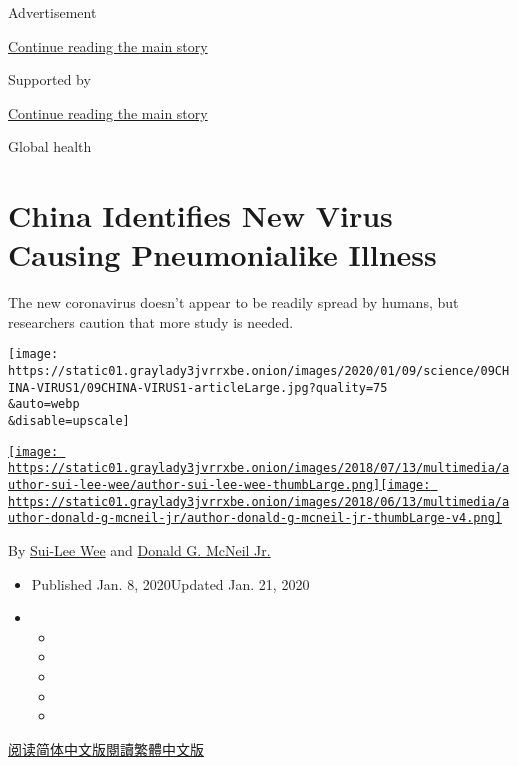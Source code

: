 Advertisement

\protect\hyperlink{after-top}{Continue reading the main story}

Supported by

\protect\hyperlink{after-sponsor}{Continue reading the main story}

Global health

\hypertarget{china-identifies-new-virus-causing-pneumonialike-illness}{%
\section{China Identifies New Virus Causing Pneumonialike
Illness}\label{china-identifies-new-virus-causing-pneumonialike-illness}}

The new coronavirus doesn't appear to be readily spread by humans, but
researchers caution that more study is needed.

\texttt{[image: https://static01.graylady3jvrrxbe.onion/images/2020/01/09/science/09CHINA-VIRUS1/09CHINA-VIRUS1-articleLarge.jpg?quality=75\\\&auto=webp\\\&disable=upscale]}

\href{https://www.nytimes3xbfgragh.onion/by/sui-lee-wee}{\texttt{[image: https://static01.graylady3jvrrxbe.onion/images/2018/07/13/multimedia/author-sui-lee-wee/author-sui-lee-wee-thumbLarge.png]}}\href{https://www.nytimes3xbfgragh.onion/by/donald-g-mcneil-jr}{\texttt{[image: https://static01.graylady3jvrrxbe.onion/images/2018/06/13/multimedia/author-donald-g-mcneil-jr/author-donald-g-mcneil-jr-thumbLarge-v4.png]}}

By \href{https://www.nytimes3xbfgragh.onion/by/sui-lee-wee}{Sui-Lee Wee}
and
\href{https://www.nytimes3xbfgragh.onion/by/donald-g-mcneil-jr}{Donald
G. McNeil Jr.}

\begin{itemize}
\item
  Published Jan. 8, 2020Updated Jan. 21, 2020
\item
  \begin{itemize}
  \item
  \item
  \item
  \item
  \item
  \end{itemize}
\end{itemize}

\href{https://cn.nytimes3xbfgragh.onion/china/20200109/china-pneumonia-outbreak-virus/}{阅读简体中文版}\href{https://cn.nytimes3xbfgragh.onion/china/20200109/china-pneumonia-outbreak-virus/zh-hn}{閱讀繁體中文版}

